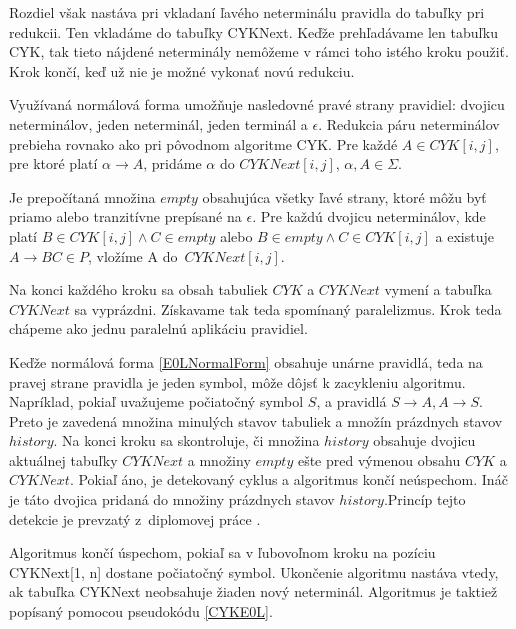 Rozdiel však nastáva pri vkladaní ľavého neterminálu pravidla do tabuľky pri redukcii. Ten vkladáme do tabuľky CYKNext. Keďže prehľadávame len tabuľku CYK, tak tieto nájdené neterminály nemôžeme v rámci toho istého kroku použiť. Krok končí, keď už nie je možné vykonať novú redukciu.

Využívaná normálová forma umožňuje nasledovné pravé strany pravidiel: dvojicu neterminálov, jeden neterminál, jeden terminál a $\epsilon$. Redukcia páru neterminálov prebieha rovnako ako pri pôvodnom algoritme CYK. Pre každé $A \in CYK[i, j]$, pre ktoré platí $\alpha \to A$, pridáme $\alpha$ do $CYKNext[i, j]$, $\alpha, A \in \Sigma$.

Je prepočítaná množina $empty$ obsahujúca všetky ľavé strany, ktoré môžu byť priamo alebo tranzitívne prepísané na $\epsilon$. Pre každú dvojicu neterminálov, kde platí $B \in CYK[i, j] \land C \in empty$ alebo $B \in empty \land C \in CYK[i, j]$ a existuje $A \to BC \in P$, vložíme A do~$CYKNext[i, j]$.

Na konci každého kroku sa obsah tabuliek $CYK$ a $CYKNext$ vymení a tabuľka $CYKNext$ sa vyprázdni. Získavame tak teda spomínaný paralelizmus. Krok teda chápeme ako jednu paralelnú aplikáciu pravidiel.

Keďže normálová forma \ref{E0LNormalForm} obsahuje unárne pravidlá, teda na pravej strane pravidla je jeden symbol, môže dôjsť k zacykleniu algoritmu. Napríklad, pokiaľ uvažujeme počiatočný symbol $S$, a pravidlá $S \to A, A \to S$. Preto je zavedená množina minulých stavov tabuliek a množín prázdnych stavov $history$. Na konci kroku sa skontroluje, či množina $history$ obsahuje dvojicu aktuálnej tabuľky $CYKNext$ a množiny $empty$ ešte pred výmenou obsahu $CYK$ a $CYKNext$. Pokiaľ áno, je detekovaný cyklus a algoritmus končí neúspechom. Ináč je táto dvojica pridaná do množiny prázdnych stavov $history$.Princíp tejto detekcie je prevzatý z~diplomovej práce \cite{FITMT21128}.

Algoritmus končí úspechom, pokiaľ sa v ľubovoľnom kroku na pozíciu CYKNext[1, n] dostane počiatočný symbol. Ukončenie algoritmu nastáva vtedy, ak tabuľka CYKNext neobsahuje žiaden nový neterminál. Algoritmus je taktiež popísaný pomocou pseudokódu \ref{CYKE0L}.


